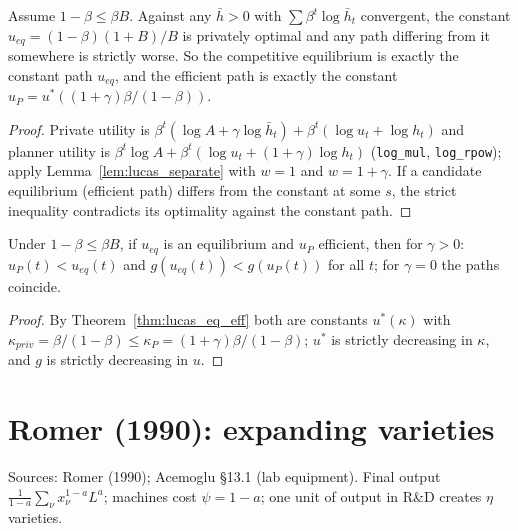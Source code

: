 \begin{theorem}
\label{thm:lucas_eq_eff}
\leanok
{}
Assume $1 - \beta \le \beta B$. Against any $\bar h > 0$ with $\sum\beta^t\log\bar h_t$ convergent, the constant
$u_{eq} = (1-\beta)(1+B)/B$ is privately optimal and any path differing from it somewhere is strictly worse. So the
competitive equilibrium is exactly the constant path $u_{eq}$, and the efficient path is exactly the constant
$u_P = u^*((1+\gamma)\beta/(1-\beta))$.
\end{theorem}
\begin{proof}
\leanok
Private utility is $\beta^t(\log A + \gamma\log\bar h_t) + \beta^t(\log u_t + \log h_t)$ and planner utility is
$\beta^t\log A + \beta^t(\log u_t + (1+\gamma)\log h_t)$ (\texttt{log\_mul}, \texttt{log\_rpow}); apply
Lemma~\ref{lem:lucas_separate} with $w = 1$ and $w = 1 + \gamma$. If a candidate equilibrium (efficient path) differs
from the constant at some $s$, the strict inequality contradicts its optimality against the constant path.
\end{proof}

\begin{theorem}
\label{thm:lucas}
\leanok
{}
Under $1 - \beta \le \beta B$, if $u_{eq}$ is an equilibrium and $u_P$ efficient, then for $\gamma > 0$:
$u_P(t) < u_{eq}(t)$ and $g(u_{eq}(t)) < g(u_P(t))$ for all $t$; for $\gamma = 0$ the paths coincide.
\end{theorem}
\begin{proof}
\leanok
By Theorem~\ref{thm:lucas_eq_eff} both are constants $u^*(\kappa)$ with $\kappa_{priv} = \beta/(1-\beta) \le
\kappa_P = (1+\gamma)\beta/(1-\beta)$; $u^*$ is strictly decreasing in $\kappa$, and $g$ is strictly decreasing in $u$.
\end{proof}

\section{Romer (1990): expanding varieties}
\label{sec:romer}

Sources: Romer (1990); Acemoglu \S13.1 (lab equipment). Final output
$\frac{1}{1-a}\sum_\nu x_\nu^{1-a}L^a$; machines cost $\psi = 1 - a$; one unit of output in R\&D creates $\eta$ varieties.

